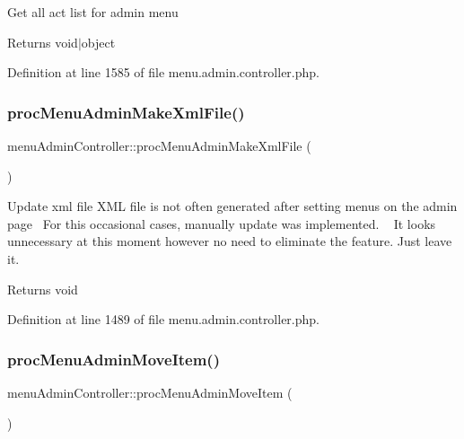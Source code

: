 Get all act list for admin menu \begin{DoxyReturn}{Returns}
void$\vert$object 
\end{DoxyReturn}


Definition at line 1585 of file menu.\+admin.\+controller.\+php.

\mbox{\label{classmenuAdminController_a8808afabf9eee859aca4150fc5d23051}} 
\subsubsection{\texorpdfstring{proc\+Menu\+Admin\+Make\+Xml\+File()}{procMenuAdminMakeXmlFile()}}
{\footnotesize\ttfamily menu\+Admin\+Controller\+::proc\+Menu\+Admin\+Make\+Xml\+File (\begin{DoxyParamCaption}{ }\end{DoxyParamCaption})}

Update xml file X\+ML file is not often generated after setting menus on the admin page~\newline
For this occasional cases, manually update was implemented. ~\newline
It looks unnecessary at this moment however no need to eliminate the feature. Just leave it. \begin{DoxyReturn}{Returns}
void 
\end{DoxyReturn}


Definition at line 1489 of file menu.\+admin.\+controller.\+php.

\mbox{\label{classmenuAdminController_a4b1060e3cfddcffae2881a2981660b8b}} 
\subsubsection{\texorpdfstring{proc\+Menu\+Admin\+Move\+Item()}{procMenuAdminMoveItem()}}
{\footnotesize\ttfamily menu\+Admin\+Controller\+::proc\+Menu\+Admin\+Move\+Item (\begin{DoxyParamCaption}{ }\end{DoxyParamCaption})}

